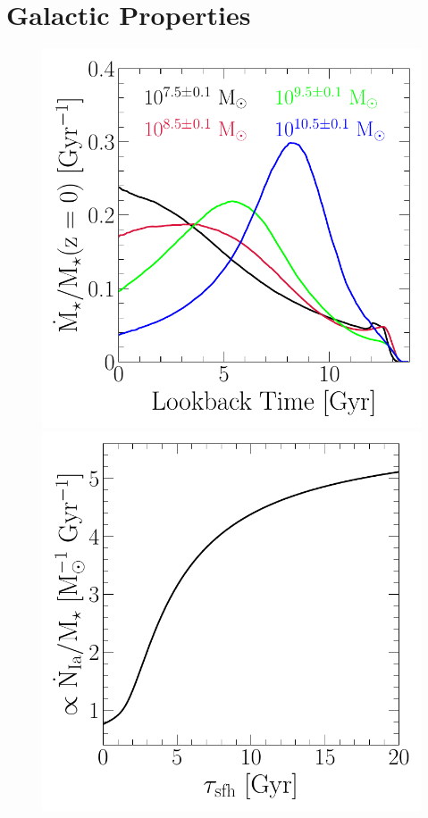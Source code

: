 \documentclass[ms.tex]{subfiles}
\begin{document}
\section{Galactic Properties}
\label{sec:galprops}

\begin{figure}
\centering
\includegraphics[scale = 0.43]{umachine_sfhs.pdf}
\includegraphics[scale = 0.42]{iarate_vs_tausfh.pdf}

\end{figure}
\end{document}
